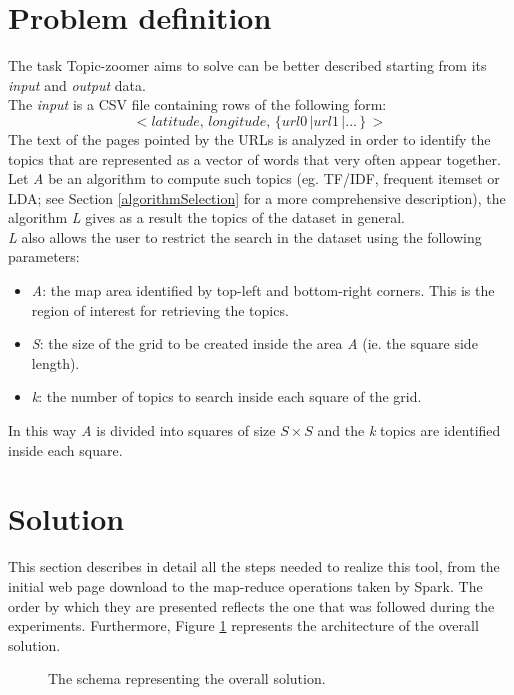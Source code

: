 \documentclass{sig-alternate-05-2015}
\begin{document}
\section{Problem definition}
The task Topic-zoomer aims to solve can be better described starting from its \emph{input} and \emph{output} data.\\
The \emph{input} is a CSV file containing rows of the following form:
\begin{equation}\label{dataset}
    <latitude,\,longitude,\,\{url0\,|url1\,|...\,\}\,>
\end{equation}
The text of the pages pointed by the URLs is analyzed in order to identify the topics that are represented as a vector of words that very often appear together.\\
Let \emph{A} be an algorithm to compute such topics (eg. TF/IDF, frequent itemset or LDA; see Section \ref{algorithmSelection} for a more comprehensive description), the algorithm \emph{L} gives as a result the topics of the dataset in general.\\
\emph{L} also allows the user to restrict the search in the dataset using the following parameters:
\begin{itemize}
    \item \emph{A}: the map area identified by top-left and bottom-right corners. This is the region of interest for retrieving the topics.
    \item \emph{S}: the size of the grid to be created inside the area \emph{A} (ie. the square side length).
    \item \emph{k}: the number of topics to search inside each square of the grid.
\end{itemize}
In this way \emph{A} is divided into squares of size $S \times S$ and the \emph{k} topics are identified inside each square.


\section{Solution}
This section describes in detail all the steps needed to realize this tool, from the initial web page download to the map-reduce operations taken by Spark. The order by which they are presented reflects the one that was followed during the experiments. Furthermore, Figure \ref{solution} represents the architecture of the overall solution.
\begin{figure}
  \caption{The schema representing the overall solution.}
  \label{solution}
\end{figure}
\end{document}

